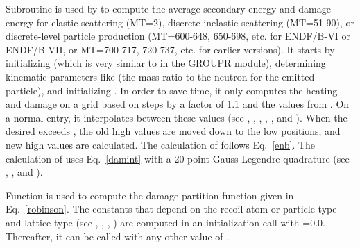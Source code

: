 Subroutine  is used by
 to compute the average secondary energy and damage
energy for elastic scattering (MT=2), discrete-inelastic scattering
(MT=51-90), or discrete-level particle production (MT=600-648,
650-698, etc. for ENDF/B-VI or ENDF/B-VII, or MT=700-717,
720-737, etc. for earlier versions).  It starts by initializing
 (which is very similar to
 in the GROUPR module),
determining kinematic parameters like  (the mass ratio
to the neutron for the emitted particle), and initializing
.  In order to save time, it only
computes the heating and damage on a grid based on steps by a
factor of 1.1 and the  values from .
On a normal entry, it interpolates between these values (see
, , , , , and
).  When the desired  exceeds ,
the old high values are moved down to the low positions, and new
high values are calculated.  The calculation of 
follows Eq.~\ref{enb}.  The calculation of  uses
Eq.~\ref{damint} with a 20-point Gauss-Legendre quadrature
(see , , and ).

Function  is used to compute the
damage partition function given in Eq.~\ref{robinson}.  The
constants that depend on the recoil atom or particle type and
lattice type (see , , , )
are computed in an initialization call with =0.0.  Thereafter,
it can be called with any other value of .

